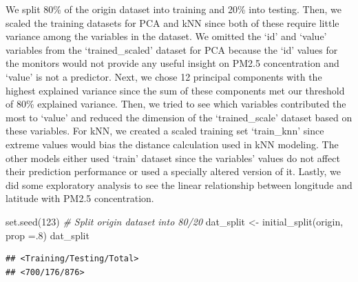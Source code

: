 \documentclass[
]{article}
\newenvironment{Shaded}{\begin{snugshade}}{\end{snugshade}}
\newcommand{\AttributeTok}[1]{\textcolor[rgb]{0.77,0.63,0.00}{#1}}
\newcommand{\CommentTok}[1]{\textcolor[rgb]{0.56,0.35,0.01}{\textit{#1}}}
\newcommand{\DecValTok}[1]{\textcolor[rgb]{0.00,0.00,0.81}{#1}}
\newcommand{\FunctionTok}[1]{\textcolor[rgb]{0.00,0.00,0.00}{#1}}
\newcommand{\NormalTok}[1]{#1}
\newcommand{\OtherTok}[1]{\textcolor[rgb]{0.56,0.35,0.01}{#1}}
\begin{document}
We split 80\% of the origin dataset into training and 20\% into testing.
Then, we scaled the training datasets for PCA and kNN since both of
these require little variance among the variables in the dataset. We
omitted the `id' and `value' variables from the `trained\_scaled'
dataset for PCA because the `id' values for the monitors would not
provide any useful insight on PM2.5 concentration and `value' is not a
predictor. Next, we chose 12 principal components with the highest
explained variance since the sum of these components met our threshold
of 80\% explained variance. Then, we tried to see which variables
contributed the most to `value' and reduced the dimension of the
`trained\_scale' dataset based on these variables. For kNN, we created a
scaled training set `train\_knn' since extreme values would bias the
distance calculation used in kNN modeling. The other models either used
`train' dataset since the variables' values do not affect their
prediction performance or used a specially altered version of it.
Lastly, we did some exploratory analysis to see the linear relationship
between longitude and latitude with PM2.5 concentration.

\begin{Shaded}
\begin{Highlighting}[]
\FunctionTok{set.seed}\NormalTok{(}\DecValTok{123}\NormalTok{)}
\CommentTok{\# Split origin dataset into 80/20}
\NormalTok{dat\_split }\OtherTok{\textless{}{-}} \FunctionTok{initial\_split}\NormalTok{(origin, }\AttributeTok{prop =}\NormalTok{.}\DecValTok{8}\NormalTok{)}
\NormalTok{dat\_split}
\end{Highlighting}
\end{Shaded}

\begin{verbatim}
## <Training/Testing/Total>
## <700/176/876>
\end{verbatim}
\end{document}
